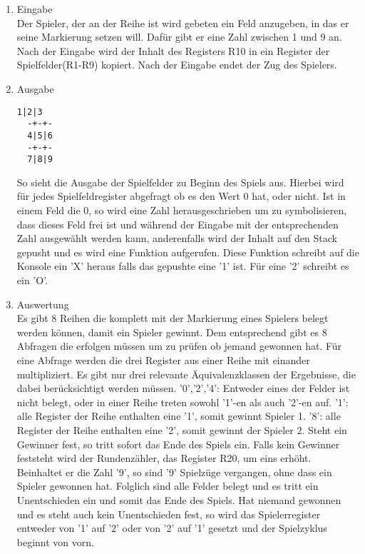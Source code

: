  \begin{enumerate}
 \item Eingabe\\
 Der Spieler, der an der Reihe ist wird gebeten ein Feld anzugeben, in das er 
 seine Markierung setzen will. Dafür gibt er eine Zahl zwischen 1 und 9 an. Nach
der Eingabe wird der Inhalt des Registers R10 in ein Register der
Spielfelder(R1-R9) kopiert. Nach der Eingabe endet der Zug des Spielers.
 \item Ausgabe
 \begin{lstlisting}[xleftmargin=6cm]
  1|2|3
  -+-+-
  4|5|6
  -+-+-
  7|8|9
 \end{lstlisting}
So sieht die Ausgabe der Spielfelder zu Beginn des Spiels aus. Hierbei wird
für jedes Spielfeldregister abgefragt ob es den Wert 0 hat, oder nicht. Ist in
einem Feld die 0, so wird eine Zahl herausgeschrieben um zu symbolisieren, dass
dieses Feld frei ist und während der Eingabe mit der entsprechenden Zahl
ausgewählt werden kann, anderenfalls wird der Inhalt auf den Stack gepusht und
es wird eine Funktion aufgerufen. Diese Funktion schreibt auf die Konsole ein
'X' heraus falls das gepushte eine '1' ist. Für eine '2' schreibt es ein 'O'.
 \item Auswertung\\
 Es gibt 8 Reihen die komplett mit der Markierung eines Spielers belegt werden 
 können, damit ein Spieler gewinnt. Dem entsprechend gibt es 8 Abfragen die
erfolgen müssen um zu prüfen ob jemand gewonnen hat. Für eine Abfrage werden die
drei Register aus einer Reihe mit einander multipliziert. Es gibt nur drei
relevante Äquivalenzklassen der Ergebnisse, die dabei berücksichtigt werden
müssen. '0','2','4': Entweder eines der Felder ist nicht belegt, oder in einer
Reihe treten sowohl '1'-en als auch '2'-en auf. '1': alle Register der Reihe
enthalten eine '1', somit gewinnt Spieler 1. '8': alle Register der Reihe
enthalten eine '2', somit gewinnt der Spieler 2. Steht ein Gewinner fest, so
tritt sofort das Ende des Spiels ein. Falls kein Gewinner feststeht wird der
Rundenzähler, das Register R20, um eins erhöht. Beinhaltet er die Zahl '9', so
sind '9' Spielzüge vergangen, ohne dass ein Spieler gewonnen hat. Folglich sind
alle Felder belegt und es tritt ein Unentschieden ein und somit das Ende des
Spiels. Hat 
niemand gewonnen und es steht auch kein Unentschieden fest, so wird das 
Spielerregister entweder von '1' auf '2' oder von '2' auf '1' gesetzt und der
Spielzyklus beginnt von vorn.
 \end{enumerate}

